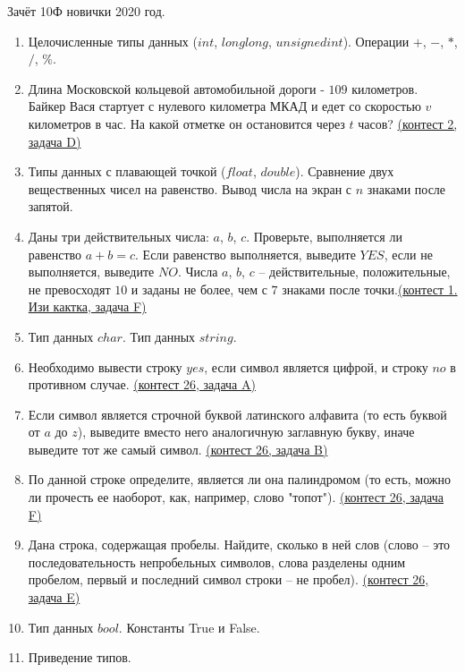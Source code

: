 \documentclass[a4paper,12pt]{article}
\begin{document}
Зачёт 10Ф новички 2020 год.
\begin{enumerate}
\item Целочисленные типы данных ($int$, $long long$, $unsigned int$). Операции $+$, $-$, $*$, $/$, $\%$.
\item Длина Московской кольцевой автомобильной дороги - $109$ километров. Байкер Вася стартует с нулевого километра МКАД и едет со скоростью $v$ километров в час. На какой отметке он остановится через $t$ часов? \href{https://informatics.msk.ru/mod/statements/view3.php?chapterid=2940}{(контест 2, задача D)} 
\item Типы данных с плавающей точкой ($float$, $double$). Сравнение двух вещественных чисел на равенство. Вывод числа на экран с $n$ знаками после запятой.
\item Даны три действительных числа: $a$, $b$, $c$. Проверьте, выполняется ли равенство $a + b = c$. Если равенство выполняется, выведите $YES$, если не выполняется, выведите $NO$. Числа $a$, $b$, $c$ –  действительные, положительные, не превосходят $10$ и заданы не более, чем с $7$ знаками после точки.\href{https://informatics.msk.ru/mod/statements/view3.php?chapterid=74}{(контест 1. Изи кактка, задача F)}
\item Тип данных $char$. Тип данных $string$.
\item Необходимо вывести  строку $yes$, если символ является цифрой, и строку $no$ в противном случае. \href{https://informatics.msk.ru/mod/statements/view3.php?chapterid=102}{(контест 26, задача A)}
\item Если символ является строчной буквой латинского алфавита (то есть буквой от $a$ до $z$), выведите вместо него аналогичную заглавную букву, иначе выведите тот же самый символ. \href{https://informatics.msk.ru/mod/statements/view3.php?chapterid=103}{(контест 26, задача B)}
\item По данной строке определите, является ли она палиндромом (то есть, можно ли прочесть ее наоборот, как, например, слово "топот"). \href{https://informatics.msk.ru/mod/statements/view3.php?chapterid=108}{(контест 26, задача F)}
\item Дана строка, содержащая пробелы. Найдите, сколько в ней слов (слово – это последовательность непробельных символов, слова разделены одним пробелом, первый и последний символ строки – не пробел). \href{https://informatics.msk.ru/mod/statements/view3.php?chapterid=106}{(контест 26, задача E)}
\item Тип данных $bool$. Константы True и False.
\item Приведение типов.

\end{enumerate}
\end{document}
